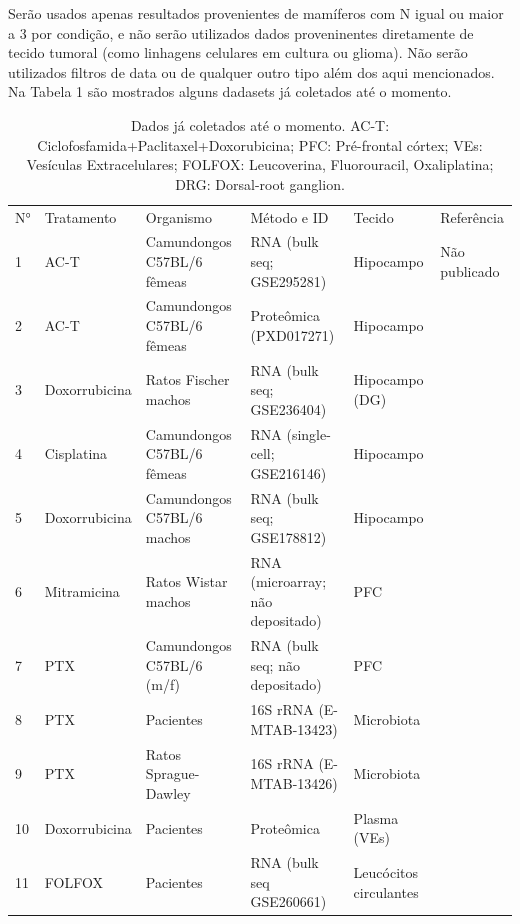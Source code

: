 \documentclass[12pt,a4paper]{article}
\begin{document}
Serão usados apenas resultados provenientes de mamíferos com N igual ou maior a 3 por condição, e não serão utilizados dados proveninentes diretamente de tecido tumoral (como linhagens celulares em cultura ou glioma). Não serão utilizados filtros de data ou de  qualquer outro tipo além dos aqui mencionados. Na Tabela 1 são mostrados alguns dadasets já coletados até o momento. \\
\begin{center}	
	\centering	\small	\begin{longtable}{p{0.5cm} p{2.5cm} p{3cm} p{3cm} p{2cm} p{3cm}}
	\captionsetup{justification=justified, width=\textwidth}
	\caption{Dados já coletados até o momento. AC-T: Ciclofosfamida+Paclitaxel+Doxorubicina; PFC: Pré-frontal córtex; VEs: Vesículas Extracelulares; FOLFOX: Leucoverina, Fluorouracil, Oxaliplatina; DRG: Dorsal-root ganglion.}  \\
	\toprule  
	N° & Tratamento & Organismo & Método e ID & Tecido & Referência \\  
	\midrule  
	\endfirsthead  
		1 & AC-T & Camundongos C57BL/6 fêmeas & RNA (bulk seq; GSE295281) & Hipocampo & Não publicado \\
		2 & AC-T & Camundongos C57BL/6 fêmeas & Proteômica (PXD017271) & Hipocampo & \cite{McElroy2020} \\
		3 & Doxorrubicina & Ratos Fischer machos & RNA (bulk seq; GSE236404) & Hipocampo (DG) & \cite{Budamagunta2024} \\
		4 & Cisplatina & Camundongos C57BL/6 fêmeas & RNA (single-cell; GSE216146) & Hipocampo & \cite{Kim2024} \\
		5 & Doxorrubicina & Camundongos C57BL/6 machos & RNA (bulk seq; GSE178812) & Hipocampo & \cite{Cavalier2021} \\		
		6 & Mitramicina  & Ratos Wistar machos & RNA (microarray; não depositado) & PFC & \cite{Asor2018} \\
		7 & PTX & Camundongos C57BL/6 (m/f) & RNA (bulk seq; não depositado)	 & PFC & \cite{Liang2020} \\
		8 & PTX & Pacientes & 16S rRNA (E-MTAB-13423) & Microbiota & \cite{Zhong2023} \\
		9 & PTX & Ratos Sprague-Dawley & 16S rRNA (E-MTAB-13426) & Microbiota & \cite{Zhong2023} \\
		10 & Doxorrubicina & Pacientes & Proteômica & Plasma (VEs) &  \cite{Koh2021} \\
		11 & FOLFOX & Pacientes & RNA (bulk seq GSE260661) & Leucócitos circulantes & \cite{Ju2024} \\

\end{longtable}
\end{center}
\end{document}
